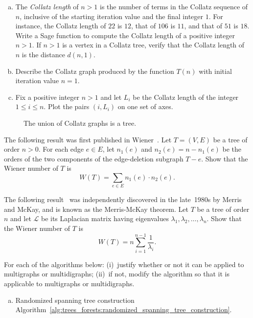 \begin{problem}
\begin{enumerate}[(a)]
  \item The \emph{Collatz length} of $n > 1$ is
    the number of terms in the Collatz sequence of $n$, inclusive of
    the starting iteration value and the final integer $1$. For
    instance, the Collatz length of $22$ is $12$, that of $106$ is
    $11$, and that of $51$ is $18$. Write a Sage function to compute
    the Collatz length of a positive integer $n > 1$. If $n > 1$ is a
    vertex in a Collatz tree, verify that the Collatz length of $n$ is
    the distance $d(n,1)$.

  \item Describe the Collatz graph produced by
    the function $T(n)$ with initial iteration value $n = 1$.

  \item Fix a positive integer $n > 1$ and let $L_i$ be the Collatz
    length of the integer $1 \leq i \leq n$. Plot the pairs $(i, L_i)$
    on one set of axes.
  \end{enumerate}

\begin{figure}[!htbp]
\centering
{}

\caption{The union of Collatz graphs is a tree.}
\label{fig:trees_forests:Collatz_graph_union}
\end{figure}

\item The following result was first published in
  Wiener~\cite{Wiener1947}. Let $T = (V,E)$ be a
  tree of order $n > 0$. For each edge $e \in E$, let $n_1(e)$ and
  $n_2(e) = n - n_1(e)$ be the orders of the two components of the
  edge-deletion subgraph $T - e$. Show
  that the Wiener number of $T$ is
  \[
  W(T)
  =
  \sum_{e \in E} n_1(e) \cdot n_2(e).
  \]

\item The following result~\cite{MoharEtAl1993} was independently
  discovered in the late~1980s by Merris and McKay, and is known as
  the Merris-McKay theorem. Let $T$ be a
  tree of order $n$ and let $\mathcal{L}$ be its
  Laplacian matrix having
  eigenvalues
  $\lambda_1, \lambda_2, \dots, \lambda_n$. Show that the
  Wiener number of $T$ is
  \[
  W(T)
  =
  n \sum_{i=1}^{n-1} \frac{1}{\lambda_i}.
  \]

\item For each of the algorithms below: (i)~justify whether or not
  it can be applied to multigraphs or multidigraphs; (ii)~if not,
  modify the algorithm so that it is applicable to multigraphs or
  multidigraphs.
  \begin{enumerate}[(a)]
  \item Randomized
    spanning tree construction
    Algorithm~\ref{alg:trees_forests:randomized_spanning_tree_construction}.


\end{enumerate}
\end{problem}
